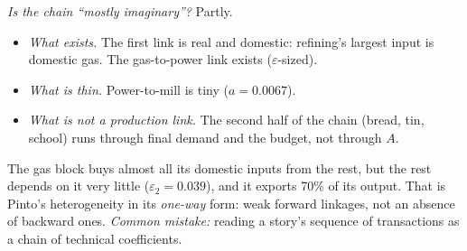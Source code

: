 \documentclass[../solutions_manual.tex]{subfiles}
\begin{document}
\emph{Is the chain ``mostly imaginary''?} Partly.
\begin{itemize}
\item \emph{What exists.} The first link is real and domestic: refining's largest input is domestic gas. The gas-to-power link exists ($\varepsilon$-sized).
\item \emph{What is thin.} Power-to-mill is tiny ($a = 0.0067$).
\item \emph{What is not a production link.} The second half of the chain (bread, tin, school) runs through final demand and the budget, not through $A$.
\end{itemize}
The gas block buys almost all its domestic inputs from the rest, but the rest depends on it very little ($\varepsilon_2 = 0.039$), and it exports 70\% of its output. That is Pinto's heterogeneity in its \emph{one-way} form: weak forward linkages, not an absence of backward ones. \emph{Common mistake:} reading a story's sequence of transactions as a chain of technical coefficients.
\end{document}
